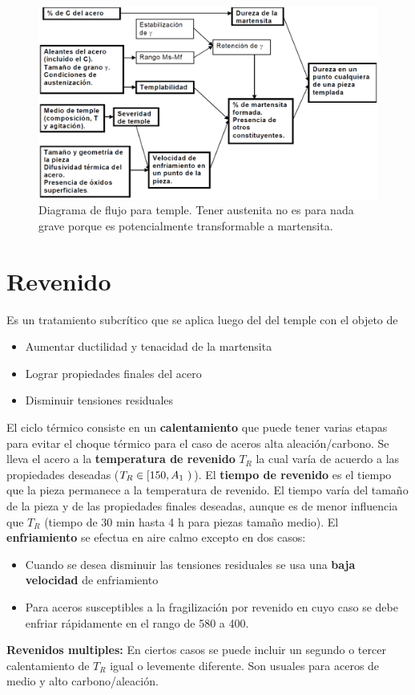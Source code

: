 \begin{figure}[htb!]
    \centering
    \includegraphics[width=.9\textwidth]{fig/flowdiagTemple.PNG}
    \caption{Diagrama de flujo para temple. Tener austenita no es para nada grave porque es potencialmente transformable a martensita.}
    \label{fig:flowdiagTemple}
\end{figure}

\section{Revenido}
Es un tratamiento subcrítico que se aplica luego del del temple con el objeto de 
\begin{itemize}
    \item Aumentar ductilidad y tenacidad de la martensita
    \item Lograr propiedades finales del acero
    \item Disminuir tensiones residuales
\end{itemize}

El ciclo térmico consiste en un \textbf{calentamiento} que puede tener varias etapas para evitar el choque térmico para el caso de aceros alta aleación/carbono. Se lleva el acero a la \textbf{temperatura de revenido} $T_R$ la cual varía de acuerdo a las propiedades deseadas ($T_R\in [150, A_{1}~)$\grad{}).  El \textbf{tiempo de revenido} es el tiempo que la pieza permanece a la temperatura de revenido. El tiempo varía del tamaño de la pieza y de las propiedades finales deseadas, aunque es de menor influencia que $T_R$ (tiempo de 30 min hasta 4 h para piezas tamaño medio). El \textbf{enfriamiento} se efectua en aire calmo excepto en dos casos: 
\begin{itemize}
    \item Cuando se desea disminuir las tensiones residuales se usa una \textbf{baja velocidad} de enfriamiento
    \item Para aceros susceptibles a la fragilización por revenido en cuyo caso se debe enfriar rápidamente en el rango de 580 a 400\grad.
\end{itemize}
\textbf{Revenidos multiples:} En ciertos casos se puede incluir un segundo o tercer calentamiento de $T_R$ igual o levemente diferente. Son usuales para aceros de medio y alto carbono/aleación.


